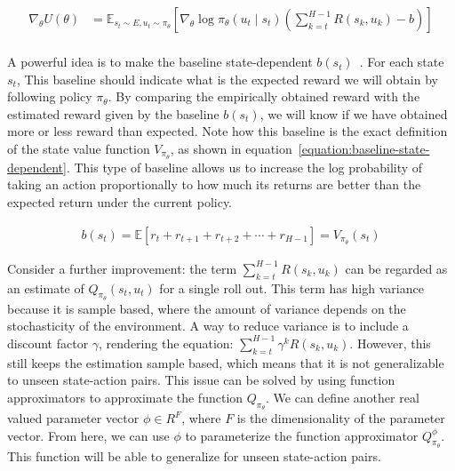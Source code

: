 \documentclass{../main.tex}{}
\begin{document}
\begin{equation}\label{equation:utility-gradient-baseline-temporal}
\begin{aligned}
\nabla_{\theta} U(\theta) & = \mathbb{E}_{s_t \sim E, u_t \sim \pi_{\theta}} [\nabla_{\theta} \log \pi_{\theta}(u_t \mid s_t) (\sum_{k=t}^{H-1}R(s_k, u_k) - b)] \\
\end{aligned}
\end{equation}

A powerful idea is to make the baseline state-dependent $b(s_t)$~\citep{Baxter2001}. For each state $s_t$, This baseline should indicate what is the expected reward we will obtain by following policy $\pi_{\theta}$. By comparing the empirically obtained reward with the estimated reward given by the baseline $b(s_t)$, we will know if we have obtained more or less reward than expected. Note how this baseline is the exact definition of the state value function $V_{\pi_{\theta}}$, as shown in equation~\ref{equation:baseline-state-dependent}. This type of baseline allows us to increase the log probability of taking an action proportionally to how much its returns are better than the expected return under the current policy.

\begin{equation}\label{equation:baseline-state-dependent}
\begin{aligned}
b(s_t) = \mathbb{E}[r_t + r_{t+1} + r_{t+2} + \cdots + r_{H-1}] = V_{\pi_{\theta}}(s_t)
\end{aligned}
\end{equation}

Consider a further improvement: the term $\sum_{k=t}^{H-1}R(s_k, u_k)$ can be regarded as an estimate of $Q_{\pi_{\theta}}(s_t, u_t)$ for a single roll out. This term has high variance because it is sample based, where the amount of variance depends on the stochasticity of the environment. A way to reduce variance is to include a discount factor $\gamma$, rendering the equation: $\sum_{k=t}^{H-1} \gamma^k  R(s_k, u_k)$. However, this still keeps the estimation sample based, which means that it is not generalizable to unseen state-action pairs. This issue can be solved by using function approximators to approximate the function $Q_{\pi_{\theta}}$. We can define another real valued parameter vector $\phi \in R^F$, where $F$ is the dimensionality of the parameter vector. From here, we can use $\phi$ to parameterize the function approximator $Q^{\phi}_{\pi_{\theta}}$. This function will be able to generalize for unseen state-action pairs. 
\end{document}
